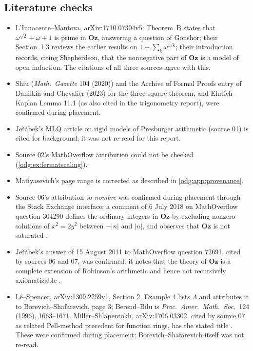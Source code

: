 \documentclass[11pt,oneside]{article}
\numberwithin{equation}{section}
\theoremstyle{definition}
\theoremstyle{remark}
\newcommand{\Oz}{\mathbf{Oz}}
\begin{document}
\subsection{Literature checks}

\begin{itemize}[leftmargin=*]
\item L'Innocente--Mantova, arXiv:1710.07304v5: Theorem~B states that
$\omega^{\sqrt2}+\omega+1$ is prime in $\Oz$, answering a question of Gonshor;
their Section~1.3 reviews the earlier results on $1+\sum_k\omega^{1/k}$; their
introduction records, citing Shepherdson, that the nonnegative part of $\Oz$
is a model of open induction. The citations of all three sources agree with
this.
\item Shiu (\emph{Math.\ Gazette} 104 (2020)) and the Archive of Formal Proofs
entry of Danilkin and Chevalier (2023) for the three-square theorem, and
Ehrlich--Kaplan Lemma 11.1 (as also cited in the trigonometry report), were
confirmed during placement.
\item Je\v r\'abek's MLQ article on rigid models of Presburger arithmetic
(source 01) is cited for background; it was not re-read for this report.
\item Source 02's MathOverflow attribution could not be checked
(\cref{odg:ex:fermatscaling}).
\item Matiyasevich's page range is corrected as described in
\cref{odg:app:provenance}.
\item Source 06's attribution to \emph{nombre} was confirmed during placement
through the Stack Exchange interface: a comment of 6 July 2018 on
MathOverflow question 304290 defines the ordinary integers in $\Oz$ by
excluding nonzero solutions of $x^2=2y^2$ between $-|n|$ and $|n|$, and
observes that $\Oz$ is not saturated \cite{Nombre}.
\item Je\v r\'abek's answer of 15 August 2011 to MathOverflow question 72691,
cited by sources 06 and 07, was confirmed: it notes that the theory of $\Oz$ is
a complete extension of Robinson's arithmetic and hence not recursively
axiomatizable \cite{JerabekMO}.
\item L\^e--Spencer, arXiv:1309.2259v1, Section 2, Example 4 lists $\Lambda$ and
attributes it to Borevich--Shafarevich, page 3; Berend--Bilu is
\emph{Proc.\ Amer.\ Math.\ Soc.}\ 124 (1996), 1663--1671. Miller--Shlapentokh,
arXiv:1706.03302, cited by source 07 as related Pell-method precedent for
function rings, has the stated title \cite{MillerShlapentokh}. These were
confirmed during placement; Borevich--Shafarevich itself was not re-read.

\end{itemize}
\end{document}
